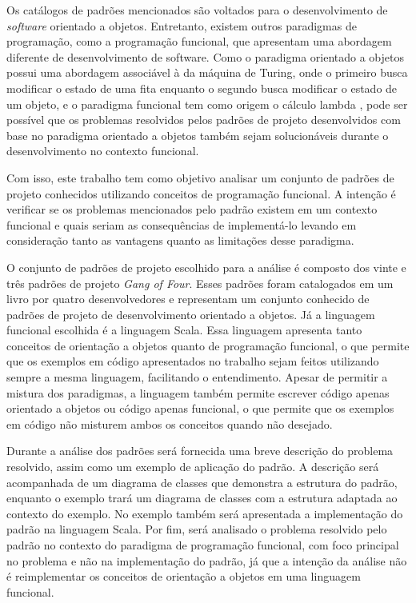 
Os catálogos de padrões mencionados são 
voltados para o desenvolvimento de \textit{software} 
orientado a objetos.\cite{gamma:1995} Entretanto, existem 
outros paradigmas de programação, como 
a programação funcional, que apresentam 
uma abordagem diferente de desenvolvimento 
de software.
Como o paradigma orientado a objetos possui uma 
abordagem associável à da máquina de Turing, onde o 
primeiro  
busca modificar o estado de uma fita enquanto o segundo 
busca modificar o estado de um objeto, e o paradigma 
funcional tem como origem o cálculo lambda
\cite{michaelson:2011}, pode ser possível que os problemas 
resolvidos pelos padrões de projeto desenvolvidos 
com base no paradigma orientado a objetos também 
sejam solucionáveis durante o desenvolvimento 
no contexto funcional. 


Com isso, este trabalho tem como objetivo 
analisar um conjunto de padrões de projeto 
conhecidos utilizando conceitos de programação 
funcional. A intenção é verificar se os 
problemas mencionados pelo padrão existem 
em um contexto funcional e quais 
seriam as consequências de implementá-lo 
levando em consideração tanto as vantagens 
quanto as limitações desse paradigma.


O conjunto de padrões de projeto escolhido 
para a análise é composto dos vinte e três 
padrões de projeto \textit{Gang of Four}. 
Esses padrões foram catalogados em um livro 
por quatro desenvolvedores e representam 
um conjunto conhecido de padrões de projeto 
de desenvolvimento orientado a objetos. \cite{gamma:1995}
Já a linguagem funcional escolhida é a 
linguagem Scala. Essa linguagem 
apresenta tanto conceitos de orientação 
a objetos quanto de programação funcional, 
o que permite que os exemplos em código 
apresentados no trabalho sejam feitos 
utilizando sempre a mesma linguagem, 
facilitando o entendimento.\cite{wampler2021}
Apesar de permitir a mistura dos 
paradigmas, a linguagem também permite  
escrever código apenas orientado a 
objetos ou código apenas funcional, 
o que permite que os exemplos em 
código não misturem ambos os conceitos 
quando não desejado.


Durante a análise dos padrões será 
fornecida uma breve descrição do problema 
resolvido, assim como um exemplo de aplicação 
do padrão. A descrição será acompanhada de 
um diagrama de classes que demonstra a 
estrutura do padrão, enquanto o exemplo 
trará um diagrama de classes com a estrutura 
adaptada ao contexto do exemplo. No exemplo 
também será apresentada a implementação 
do padrão na linguagem Scala. Por fim, será 
analisado o problema resolvido pelo padrão 
no contexto do paradigma de programação 
funcional, com foco principal no problema 
e não na implementação do padrão, já que 
a intenção da análise não é reimplementar os 
conceitos de orientação a objetos em uma 
linguagem funcional. 

